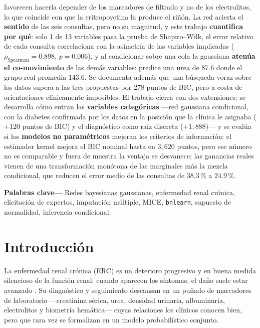 \documentclass[11pt, a4paper]{article}
\begin{document}
\begin{center}
{{            favorecen hacerla depender de los marcadores de filtrado y no de los electrolitos, lo
            que coincide con que la eritropoyetina la produce el riñón. La red acierta el
            \textbf{sentido} de las seis consultas, pero no su magnitud, y este trabajo
            \textbf{cuantifica por qué}: solo 1 de 13 variables pasa la prueba de Shapiro--Wilk,
            el error relativo de cada consulta correlaciona con la asimetría de las variables
            implicadas ($\rho_{\text{Spearman}} = 0.898$, $p = 0.006$), y al condicionar sobre una
            cola la gaussiana \textbf{atenúa el co-movimiento} de las demás variables: predice una
            urea de 87.6 donde el grupo real promedia 143.6. Se documenta además que una búsqueda
            voraz sobre los datos supera a las tres propuestas por 278 puntos de BIC, pero a costa
            de orientaciones clínicamente imposibles. El trabajo cierra con dos extensiones: se
            desarrolla cómo entran las \textbf{variables categóricas} —red gaussiana condicional,
            con la diabetes confirmada por los datos en la posición que la clínica le asignaba
            ($+120$ puntos de BIC) y el diagnóstico como raíz discreta ($+1{,}888$)— y se evalúa si
            los \textbf{modelos no paramétricos} mejoran los criterios de información: el
            estimador kernel mejora el BIC nominal hasta en $3{,}620$ puntos, pero ese número no es
            comparable y fuera de muestra la ventaja se desvanece; las ganancias reales vienen de
            una transformación monótona de las marginales más la mezcla condicional, que reducen el
            error medio de las consultas de $38.3$\,\% a $24.9$\,\%.
            \vspace{0.2cm}}}
    \vspace{0.4em}

    {\small\textbf{Palabras clave---} Redes bayesianas gaussianas, enfermedad renal crónica,
    elicitación de expertos, imputación múltiple, MICE, \texttt{bnlearn}, supuesto de normalidad,
    inferencia condicional.\par}
    \vspace{0.6em}
\end{center}

\section{Introducción}

La enfermedad renal crónica (ERC) es un deterioro progresivo y en buena medida silencioso de la
función renal: cuando aparecen los síntomas, el daño suele estar avanzado \cite{levey2012}. Su
diagnóstico y seguimiento descansan en un puñado de marcadores de laboratorio —creatinina sérica,
urea, densidad urinaria, albuminuria, electrolitos y biometría hemática— cuyas relaciones los
clínicos conocen bien, pero que rara vez se formalizan en un modelo probabilístico conjunto.
\end{document}
